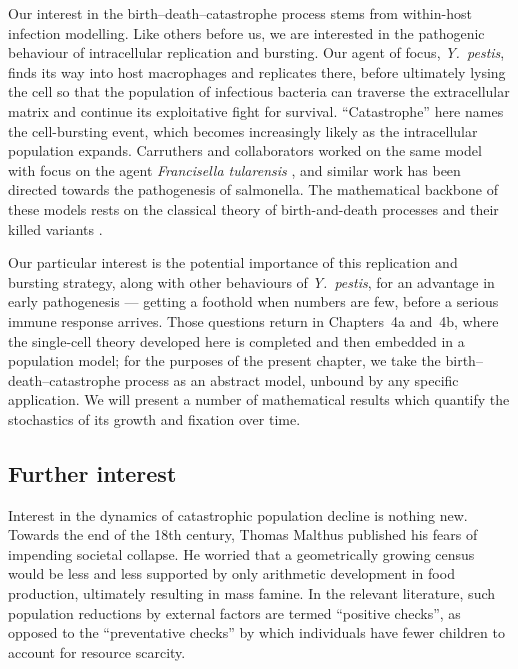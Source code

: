 Our interest in the birth--death--catastrophe process stems from within-host
infection modelling. Like others before us, we are interested
in the pathogenic behaviour of intracellular replication and bursting. Our agent
of focus, \textit{Y.~pestis}, finds its way into host macrophages and replicates
there, before ultimately lysing the cell so that the population of infectious
bacteria can traverse the extracellular matrix and continue its exploitative
fight for survival. ``Catastrophe'' here names the cell-bursting event, which
becomes increasingly likely as the intracellular population expands. Carruthers
and collaborators worked on the same model with focus on the agent
\textit{Francisella tularensis} \cite{carruthers2020stochastic}, and similar
work has been directed towards the pathogenesis of salmonella. The mathematical
backbone of these models rests on the classical theory of birth-and-death
processes and their killed variants
\cite{karlin1957classification,karlin1982linear,di2008note}.

Our particular interest is the potential importance of this replication and
bursting strategy, along with other behaviours of \textit{Y.~pestis}, for an
advantage in early pathogenesis --- getting a foothold when numbers are few,
before a serious immune response arrives. Those questions return in
Chapters~4a and~4b, where the single-cell theory developed here is completed and
then embedded in a population model; for the purposes of the present chapter, we
take the birth--death--catastrophe process as an abstract model, unbound by any
specific application. We will present a number of mathematical results which
quantify the stochastics of its growth and fixation over time.

\subsection*{Further interest}

Interest in the dynamics of catastrophic population decline is nothing new.
Towards the end of the 18th century, Thomas Malthus published his fears of
impending societal collapse. He worried that a geometrically growing census
would be less and less supported by only arithmetic development in food
production, ultimately resulting in mass famine. In the relevant literature,
such population reductions by external factors are termed ``positive checks'',
as opposed to the ``preventative checks'' by which individuals have fewer
children to account for resource scarcity.

